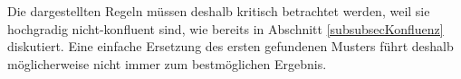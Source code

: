 Die dargestellten Regeln müssen deshalb kritisch betrachtet werden, weil sie hochgradig nicht-konfluent sind, wie bereits in Abschnitt \ref{subsubsecKonfluenz} diskutiert. Eine einfache Ersetzung des ersten gefundenen Musters führt deshalb möglicherweise nicht immer zum bestmöglichen Ergebnis.

















